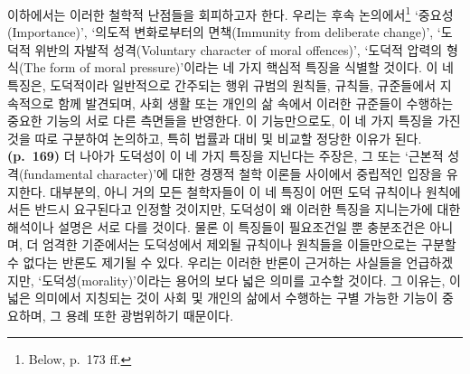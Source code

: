 이하에서는 이러한 철학적 난점들을 회피하고자 한다. 우리는 후속
논의에서\footnote{Below, p.~173 ff.} `중요성(Importance)', `의도적
변화로부터의 면책(Immunity from deliberate change)', `도덕적 위반의
자발적 성격(Voluntary character of moral offences)', `도덕적 압력의
형식(The form of moral pressure)'이라는 네 가지 핵심적 특징을 식별할
것이다. 이 네 특징은, 도덕적이라 일반적으로 간주되는 행위 규범의 원칙들,
규칙들, 규준들에서 지속적으로 함께 발견되며, 사회 생활 또는 개인의 삶
속에서 이러한 규준들이 수행하는 중요한 기능의 서로 다른 측면들을
반영한다. 이 기능만으로도, 이 네 가지 특징을 가진 것을 따로 구분하여
논의하고, 특히 법률과 대비 및 비교할 정당한 이유가 된다.
\textbf{(p.~169)} 더 나아가 도덕성이 이 네 가지 특징을 지닌다는 주장은,
그  또는 `근본적 성격(fundamental character)'에 대한
경쟁적 철학 이론들 사이에서 중립적인 입장을 유지한다. 대부분의, 아니
거의 모든 철학자들이 이 네 특징이 어떤 도덕 규칙이나 원칙에서든 반드시
요구된다고 인정할 것이지만, 도덕성이 왜 이러한 특징을 지니는가에 대한
해석이나 설명은 서로 다를 것이다. 물론 이 특징들이 필요조건일 뿐
충분조건은 아니며, 더 엄격한 기준에서는 도덕성에서 제외될 규칙이나
원칙들을 이들만으로는 구분할 수 없다는 반론도 제기될 수 있다. 우리는
이러한 반론이 근거하는 사실들을 언급하겠지만, `도덕성(morality)'이라는
용어의 보다 넓은 의미를 고수할 것이다. 그 이유는, 이 넓은 의미에서
지칭되는 것이 사회 및 개인의 삶에서 수행하는 구별 가능한 기능이
중요하며, 그 용례 또한 광범위하기 때문이다.

